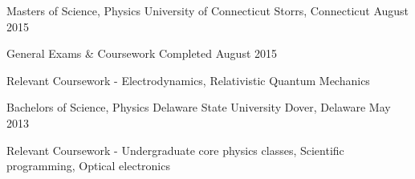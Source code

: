 

\begin{cventries}


\cventry
{Masters of Science, Physics}
{University of Connecticut}
{Storrs, Connecticut}
{August 2015}
{
\begin{cvitems}
\item General Exams \& Coursework Completed August 2015
\item Relevant Coursework - Electrodynamics, Relativistic Quantum Mechanics
\end{cvitems}
}

\cventry
    {Bachelors of Science, Physics} %
    {Delaware State University} %
    {Dover, Delaware} %
    {May 2013} %
    {
        \begin{cvitems}
            \item Relevant Coursework - Undergraduate core physics classes, Scientific programming, Optical electronics
        \end{cvitems}
    }
\end{cventries}
